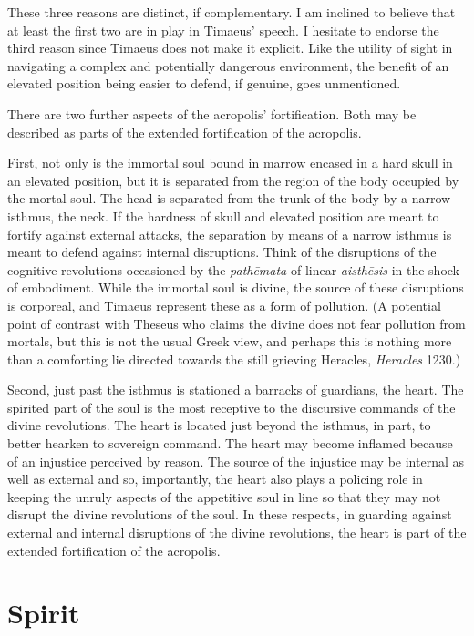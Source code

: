 These three reasons are distinct, if complementary. I am inclined to believe that at least the first two are in play in Timaeus' speech.  I hesitate to endorse the third reason since Timaeus does not make it explicit. Like the utility of sight in navigating a complex and potentially dangerous environment, the benefit of an elevated position being easier to defend, if genuine, goes unmentioned.

There are two further aspects of the acropolis' fortification. Both may be described as parts of the extended fortification of the acropolis.

First, not only is the immortal soul bound in marrow encased in a hard skull in an elevated position, but it is separated from the region of the body occupied by the mortal soul. The head is separated from the trunk of the body by a narrow isthmus, the neck. If the hardness of skull and elevated position are meant to fortify against external attacks, the separation by means of a narrow isthmus is meant to defend against internal disruptions. Think of the disruptions of the cognitive revolutions occasioned by the \emph{pathēmata} of linear \emph{aisthēsis} in the shock of embodiment. While the immortal soul is divine, the source of these disruptions is corporeal, and Timaeus represent these as a form of pollution. (A potential point of contrast with Theseus who claims the divine does not fear pollution from mortals, but this is not the usual Greek view, and perhaps this is nothing more than a comforting lie directed towards the still grieving Heracles, \emph{Heracles} 1230.)

Second, just past the isthmus is stationed a barracks of guardians, the heart. The spirited part of the soul is the most receptive to the discursive commands of the divine revolutions. The heart is located just beyond the isthmus, in part, to better hearken to sovereign command. The heart may become inflamed because of an injustice perceived by reason. The source of the injustice may be internal as well as external and so, importantly, the heart also plays a policing role in keeping the unruly aspects of the appetitive soul in line so that they may not disrupt the divine revolutions of the soul. In these respects, in guarding against external and internal disruptions of the divine revolutions, the heart is part of the extended fortification of the acropolis.


\section{Spirit} %
\label{sec:spirit}

